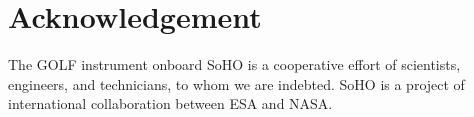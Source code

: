 \documentclass[journal]{IEEEtran}
\begin{document}
	
\section*{Acknowledgement}
The GOLF instrument onboard SoHO is a cooperative effort of scientists, engineers, and technicians, to whom we are indebted. SoHO is a project of international collaboration between ESA and NASA.

 
\end{document}
